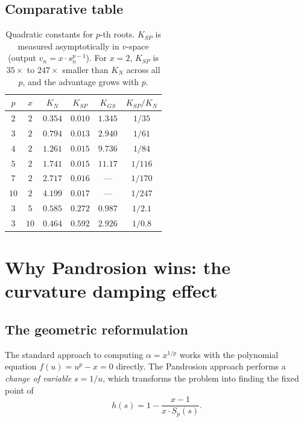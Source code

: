 \documentclass[10pt,a4paper,oneside]{book}
\theoremstyle{definition}
\theoremstyle{remark}
\begin{document}
\subsection{Comparative table}

\begin{table}[H]
\centering
\renewcommand{\arraystretch}{1.25}
\begin{tabular}{cccccc}
\toprule
$p$ & $x$ & $K_N$ & $K_{SP}$ & $K_{GS}$ & $K_{SP}/K_N$ \\
\midrule
$2$ & $2$ & $0.354$ & $0.010$ & $1.345$ & $1/35$ \\
$3$ & $2$ & $0.794$ & $0.013$ & $2.940$ & $1/61$ \\
$4$ & $2$ & $1.261$ & $0.015$ & $9.736$ & $1/84$ \\
$5$ & $2$ & $1.741$ & $0.015$ & $11.17$ & $1/116$ \\
$7$ & $2$ & $2.717$ & $0.016$ & --- & $1/170$ \\
$10$ & $2$ & $4.199$ & $0.017$ & --- & $1/247$ \\
\midrule
$3$ & $5$ & $0.585$ & $0.272$ & $0.987$ & $1/2.1$ \\
$3$ & $10$ & $0.464$ & $0.592$ & $2.926$ & $1/0.8$ \\
\bottomrule
\end{tabular}
\caption{Quadratic constants for $p$-th roots.  $K_{SP}$ is measured asymptotically in $v$-space (output $v_n = x \cdot s_n^{p-1}$).  For $x=2$, $K_{SP}$ is $35\times$ to $247\times$ smaller than $K_N$ across all $p$, and the advantage grows with $p$.}
\label{tab:constants}
\end{table}

\section{Why Pandrosion wins: the curvature damping effect}
\label{sec:why}

\subsection{The geometric reformulation}

The standard approach to computing $\alpha = x^{1/p}$ works with the polynomial equation $f(u) = u^p - x = 0$ directly.  The Pandrosion approach performs a \emph{change of variable} $s = 1/u$, which transforms the problem into finding the fixed point of
\[
  h(s) = 1 - \frac{x-1}{x \cdot S_p(s)}.
\]
\end{document}

